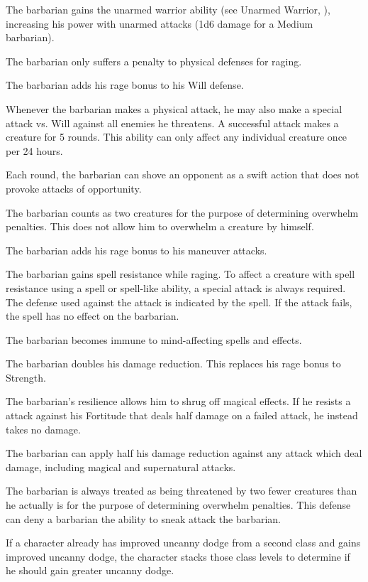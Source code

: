  The barbarian gains the unarmed warrior ability (see Unarmed Warrior, ), increasing his power with unarmed attacks (1d6 damage for a Medium barbarian).

 The barbarian only suffers a  penalty to physical defenses for raging.

 The barbarian adds his rage bonus to his Will defense.

 Whenever the barbarian makes a physical attack, he may also make a special attack vs. Will against all enemies he threatens. A successful attack makes a creature \shaken for 5 rounds. This ability can only affect any individual creature once per 24 hours.

 Each round, the barbarian can shove an opponent as a swift action that does not provoke attacks of opportunity.

 The barbarian counts as two creatures for the purpose of determining overwhelm penalties. This does not allow him to overwhelm a creature by himself.

 The barbarian adds his rage bonus to his maneuver attacks.

 The barbarian gains spell resistance while raging. To affect a creature with spell resistance using a spell or spell-like ability, a special attack is always required. The defense used against the attack is indicated by the spell. If the attack fails, the spell has no effect on the barbarian.

 The barbarian becomes immune to mind-affecting spells and effects.

 The barbarian doubles his damage reduction. This replaces his rage bonus to Strength.

 The barbarian's resilience allows him to shrug off magical effects. If he resists a attack against his Fortitude that deals half damage on a failed attack, he instead takes no damage.

 The barbarian can apply half his damage reduction against any attack which deal damage, including magical and supernatural attacks.

 The barbarian is always treated as being threatened by two fewer creatures than he actually is for the purpose of determining overwhelm penalties. This defense can deny a barbarian the ability to sneak attack the barbarian.
\par If a character already has improved uncanny dodge from a second class and gains improved uncanny dodge, the character stacks those class levels to determine if he should gain greater uncanny dodge.

